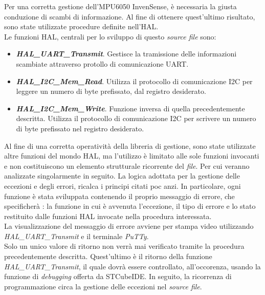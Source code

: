 \documentclass[11pt]{report}
\begin{document}
Per una corretta gestione dell'MPU6050 InvenSense, è necessaria la giusta conduzione di scambi di informazione. Al fine di ottenere quest'ultimo risultato, sono state utilizzate procedure definite nell'HAL.\\
Le funzioni HAL, centrali per lo sviluppo di questo \textit{source file} sono:
\begin{itemize}
\item \textbf{\textit{HAL\_UART\_Transmit}}. Gestisce la tramissione delle informazioni scambiate attraverso protollo di comunicazione UART.
\item \textbf{\textit{HAL\_I2C\_Mem\_Read}}. Utilizza il protocollo di comunicazione I2C per leggere un numero di byte prefissato, dal registro desiderato.
\item \textbf{\textit{HAL\_I2C\_Mem\_Write}}. Funzione inversa di quella precedentemente descritta. Utilizza il protocollo di comunicazione I2C per scrivere un numero di byte prefissato nel registro desiderato.
\end{itemize}
Al fine di una corretta operatività della libreria di gestione, sono state utilizzate altre funzioni del mondo HAL, ma l'utilizzo è limitato alle sole funzioni invocanti e non costituiscono un elemento strutturale ricorrente del \textit{file}.
Per cui veranno analizzate singolarmente in seguito.
La logica adottata per la gestione delle eccezioni e degli errori, ricalca i principi citati poc anzi. In particolare, ogni funzione è stata sviluppata contenendo il proprio messaggio di errore, che specificherà : la funzione in cui è avvenuta l'eccezione, il tipo di errore e lo stato restituito dalle funzioni HAL invocate nella procedura interessata.\\
La visualizzazione del messaggio di errore avviene per stampa video utilizzando\\\textit{HAL\_UART\_Transmit} e il terminale \textit{PuTTy}.\\
Solo un unico valore di ritorno non verrà mai verificato tramite la procedura precedentemente descritta. Quest'ultimo è il ritorno della funzione \textit{HAL\_UART\_Transmit}, il quale dovrà essere controllato, all'occorenza, usando la funzione di \textit{debugging} offerta da STCubeIDE.
In seguito, la ricorrenza di programmazione circa la gestione delle eccezioni nel \textit{source file}.\\

\end{document}
